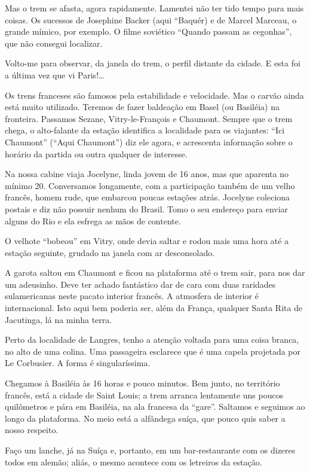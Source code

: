 Mas o trem se afasta, agora rapidamente. Lamentei não ter tido tempo para mais coisas. Os sucessos de Josephine Backer (aqui ``Baquér) e de Marcel Marceau, o grande mímico, por exemplo. O filme soviético ``Quando passam as cegonhas'', que não consegui localizar.

Volto-me para observar, da janela do trem, o perfil distante da cidade. E esta foi a última vez que vi Paris!\ldots

Os trens franceses são famosos pela estabilidade e velocidade. Mas o carvão ainda está muito utilizado. Teremos de fazer baldeação em Basel (ou Basiléia) na fronteira. Passamos Sezane, Vitry-le-François e Chaumont. Sempre que o trem chega, o alto-falante da estação identifica a localidade para os viajantes: ``Ici Chaumont'' (``Aqui Chaumont'') diz ele agora, e acrescenta informação sobre o horário da partida ou outra qualquer de interesse.

Na nossa cabine viaja Jocelyne, linda jovem de 16 anos, mas que aparenta no mínimo 20. Conversamos longamente, com a participação também de um velho francês, homem rude, que embarcou poucas estações atrás. Jocelyne coleciona postais e diz não possuir nenhum do Brasil. Tomo o seu endereço para enviar alguns do Rio e ela esfrega as mãos de contente.

O velhote ``bobeou'' em Vitry, onde devia saltar e rodou mais uma hora até a estação seguinte, grudado na janela com ar desconsolado.

A garota saltou em Chaumont e ficou na plataforma até o trem sair, para nos dar um adeusinho. Deve ter achado fantástico dar de cara com duas raridades sulamericanas neste pacato interior francês. A atmosfera de interior é internacional. Isto aqui bem poderia ser, além da França, qualquer Santa Rita de Jacutinga, lá na minha terra.

Perto da localidade de Langres, tenho a atenção voltada para uma coisa branca, no alto de uma colina. Uma passageira esclarece que é uma capela projetada por Le Corbusier. A forma é singularíssima.

Chegamos à Basiléia às 16 horas e pouco minutos. Bem junto, no território francês, está a cidade de Saint Louis; a trem arranca lentamente uns poucos quilômetros e pára em Basiléia, na ala francesa da ``gare''. Saltamos e seguimos ao longo da plataforma. No meio está a alfândega suíça, que pouco quis saber a nosso respeito.

Faço um lanche, já na Suíça e, portanto, em um bar-restaurante com os dizeres todos em alemão; aliás, o mesmo acontece com os letreiros da estação.

